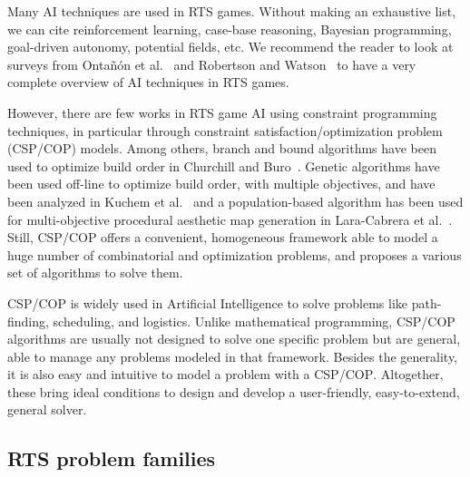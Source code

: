 \documentclass[journal]{IEEEtran}
\newcommand{\csp}{\textsc{CSP}\xspace}
\newcommand{\cop}{\textsc{COP}\xspace}
\begin{document}
Many AI techniques are used in RTS games. Without making an exhaustive
list,  we  can  cite   reinforcement  learning,  case-base  reasoning,
Bayesian programming, goal-driven autonomy,  potential fields, etc. We
recommend  the  reader to  look  at  surveys from  Onta{\~n}{\'o}n  et
al.~\cite{OntanonSURCM13} and Robertson and Watson~\cite{RobertsonW14}
to have a very complete overview of AI techniques in RTS games.

However,  there  are  few  works  in  RTS  game  AI  using  constraint
programming    techniques,    in   particular    through    constraint
satisfaction/optimization problem  (\csp/\cop) models.   Among others,
branch and bound algorithms have been  used to optimize build order in
Churchill and Buro~\cite{ChurchillB11}.   Genetic algorithms have been
used off-line to  optimize build order, with  multiple objectives, and
have  been   analyzed  in   Kuchem  et  al.~\cite{KuchemPR13}   and  a
population-based   algorithm  has   been   used  for   multi-objective
procedural    aesthetic   map    generation    in   Lara-Cabrera    et
al.~\cite{LaraCF14}.    Still,   \csp/\cop    offers   a   convenient,
homogeneous framework able to model a huge number of combinatorial and
optimization problems,  and proposes  a various  set of  algorithms to
solve them.

\csp/\cop is widely used in  Artificial Intelligence to solve problems
like  path-finding, scheduling,  and  logistics.  Unlike  mathematical
programming, \csp/\cop  algorithms are  usually not designed  to solve
one  specific problem  but are  general, able  to manage  any problems
modeled in that framework. Besides the generality, it is also easy and
intuitive  to model  a problem  with a  \csp/\cop.  Altogether,  these
bring  ideal  conditions  to   design  and  develop  a  user-friendly,
easy-to-extend, general solver.


\subsection{RTS problem families}
\end{document}
